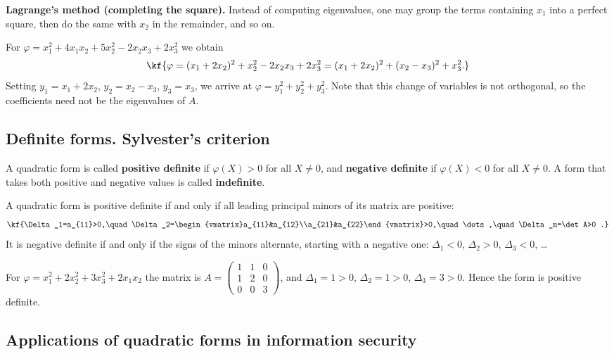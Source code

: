 \textbf{Lagrange’s method (completing the square).} Instead of computing
eigenvalues, one may group the terms containing $x_1$ into a perfect
square, then do the same with $x_2$ in the remainder, and so on.
\begin{misol}
For $\varphi=x_1^2+4x_1x_2+5x_2^2-2x_2x_3+2x_3^2$ we obtain
\[\kf{\varphi=(x_1+2x_2)^2+x_2^2-2x_2x_3+2x_3^2=(x_1+2x_2)^2+(x_2-x_3)^2+x_3^2 .}\]
Setting $y_1=x_1+2x_2$, $y_2=x_2-x_3$, $y_3=x_3$, we arrive at
$\varphi=y_1^2+y_2^2+y_3^2$. Note that this change of variables is not
orthogonal, so the coefficients need not be the eigenvalues of $A$.
\end{misol}

\subsection{Definite forms. Sylvester’s criterion}

\begin{tarif}
A quadratic form is called \textbf{positive definite} if $\varphi(X)>0$
for all $X\neq0$, and \textbf{negative definite} if $\varphi(X)<0$ for
all $X\neq0$. A form that takes both positive and negative values is
called \textbf{indefinite}.
\end{tarif}

\begin{teorema}
A quadratic form is positive definite if and only if all leading
principal minors of its matrix are positive:
\[\kf{\Delta_1=a_{11}>0,\quad \Delta_2=\begin{vmatrix}a_{11}&a_{12}\\a_{21}&a_{22}\end{vmatrix}>0,\quad\dots,\quad \Delta_n=\det A>0 .}\]
It is negative definite if and only if the signs of the minors
alternate, starting with a negative one: $\Delta_1<0$, $\Delta_2>0$,
$\Delta_3<0$, \dots
\end{teorema}

\begin{misol}
For $\varphi=x_1^2+2x_2^2+3x_3^2+2x_1x_2$ the matrix is
$A=\begin{pmatrix}1&1&0\\1&2&0\\0&0&3\end{pmatrix}$, and
$\Delta_1=1>0$, $\Delta_2=1>0$, $\Delta_3=3>0$. Hence the form is
positive definite.
\end{misol}

\subsection{Applications of quadratic forms in information security}

